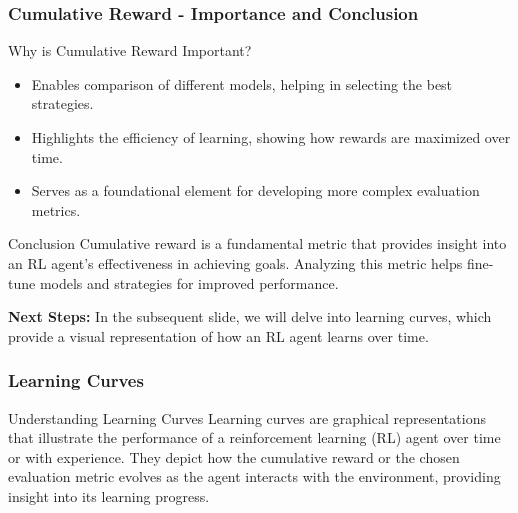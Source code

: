 \documentclass{beamer}
\begin{document}
\begin{frame}[fragile]
    \frametitle{Cumulative Reward - Importance and Conclusion}
    \begin{block}{Why is Cumulative Reward Important?}
        \begin{itemize}
            \item Enables comparison of different models, helping in selecting the best strategies.
            \item Highlights the efficiency of learning, showing how rewards are maximized over time.
            \item Serves as a foundational element for developing more complex evaluation metrics.
        \end{itemize}
    \end{block}

    \begin{block}{Conclusion}
        Cumulative reward is a fundamental metric that provides insight into an RL agent's effectiveness in achieving goals. Analyzing this metric helps fine-tune models and strategies for improved performance.
    \end{block}

    \textbf{Next Steps:} In the subsequent slide, we will delve into learning curves, which provide a visual representation of how an RL agent learns over time.
\end{frame}

\begin{frame}[fragile]
    \frametitle{Learning Curves}
    \begin{block}{Understanding Learning Curves}
        Learning curves are graphical representations that illustrate the performance of a reinforcement learning (RL) agent over time or with experience.
        They depict how the cumulative reward or the chosen evaluation metric evolves as the agent interacts with the environment, providing insight into its learning progress.
    \end{block}
\end{frame}
\end{document}
